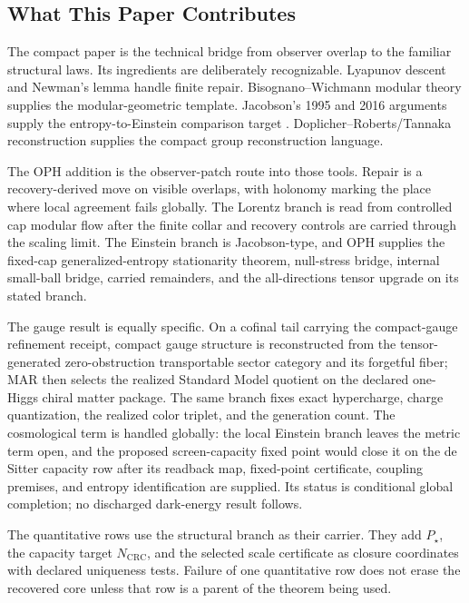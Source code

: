 \documentclass[11pt]{article}
\begin{document}
\subsection*{What This Paper Contributes}

The compact paper is the technical bridge from observer overlap to the familiar structural laws.
Its ingredients are deliberately recognizable. Lyapunov descent and Newman's lemma handle
finite repair. Bisognano--Wichmann modular theory supplies the modular-geometric template.
Jacobson's 1995 and 2016 arguments supply the entropy-to-Einstein comparison target
\cite{jacobson95,jacobson16}. Doplicher--Roberts/Tannaka reconstruction supplies the compact
group reconstruction language.

The OPH addition is the observer-patch route into those tools. Repair is a recovery-derived move
on visible overlaps, with holonomy marking the place where local agreement fails globally. The
Lorentz branch is read from controlled cap modular flow after the finite collar and recovery
controls are carried through the scaling limit. The Einstein branch is Jacobson-type, and OPH supplies the fixed-cap
generalized-entropy stationarity theorem, null-stress bridge, internal small-ball bridge, carried
remainders, and the all-directions tensor upgrade on its stated branch.

The gauge result is equally specific. On a cofinal tail carrying the compact-gauge refinement
receipt, compact gauge structure is reconstructed from the tensor-generated zero-obstruction
transportable sector category and its forgetful fiber; MAR then selects the realized Standard Model
quotient on the declared one-Higgs chiral matter package. The same branch fixes exact
hypercharge, charge quantization, the realized color triplet, and the generation count. The
cosmological term is handled globally: the local Einstein branch leaves the metric term open, and
the proposed screen-capacity fixed point would close it on the de Sitter capacity row after its
readback map, fixed-point certificate, coupling premises, and entropy identification are supplied.
Its status is conditional global completion; no
discharged dark-energy result follows.

The quantitative rows use the structural branch as their carrier. They add \(P_\star\),
the capacity target \(N_{\mathrm{CRC}}\), and the selected scale certificate as closure coordinates with
declared uniqueness tests. Failure of one quantitative row does not erase the recovered core unless
that row is a parent of the theorem being used.
\end{document}
